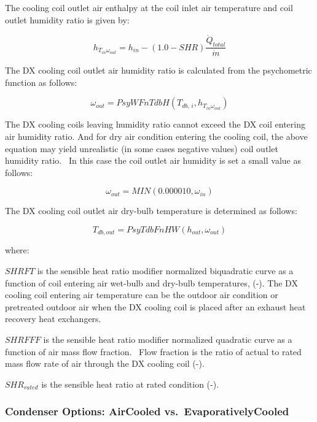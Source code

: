 The cooling coil outlet air enthalpy at the coil inlet air temperature and coil outlet humidity ratio is given by:

\begin{equation}
{h_{{T_{in}}{\omega_{out}}}} = {h_{in}} - \left( {1.0 - SHR} \right)\frac{{{{\dot Q}_{total}}}}{{\dot m}}
\end{equation}

The DX cooling coil outlet air humidity ratio is calculated from the psychometric function as follows:

\begin{equation}
{\omega_{out}} = PsyWFnTdbH\left( {{T_{db,\,i}},{h_{{T_{in}}{\omega_{out}}}}} \right)
\end{equation}

The DX cooling coils leaving humidity ratio cannot exceed the DX coil entering air humidity ratio. And for dry air condition entering the cooling coil, the above equation may yield unrealistic (in some cases negative values) coil outlet humidity ratio.~ In this case the coil outlet air humidity is set a small value as follows:

\begin{equation}
{\omega_{out}} = MIN\left( {0.000010,{\omega_{in}}} \right)
\end{equation}

The DX cooling coil outlet air dry-bulb temperature is determined as follows:

\begin{equation}
{T_{db,out}} = PsyTdbFnHW\left( {{h_{out}},{\omega_{out}}} \right)
\end{equation}

where:

\(SHRFT\) is the sensible heat ratio modifier normalized biquadratic curve as a function of coil entering air wet-bulb and dry-bulb temperatures, (-). The DX cooling coil entering air temperature can be the outdoor air condition or pretreated outdoor air when the DX cooling coil is placed after an exhaust heat recovery heat exchangers.

\(SHRFFF\) is the sensible heat ratio modifier normalized quadratic curve as a function of air mass flow fraction.~ Flow fraction is the ratio of actual to rated mass flow rate of air through the DX cooling coil (-).

\(SH{R_{rated}}\) is the sensible heat ratio at rated condition (-).

\subsubsection{Condenser Options: AirCooled vs.~EvaporativelyCooled}\label{condenser-options-aircooled-vs.evaporativelycooled}

